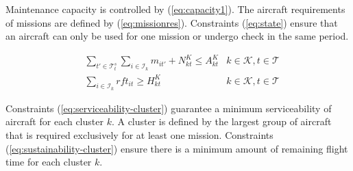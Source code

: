 \documentclass[a4paper,onecolumn,fleqn]{article}
\begin{document}
    Maintenance capacity is controlled by (\ref{eq:capacity1}). The aircraft requirements of missions are defined by (\ref{eq:missionres}). Constraints (\ref{eq:state}) ensure that an aircraft can only be used for one mission or undergo check in the same period.




    \begin{align}
       & \sum_{t' \in \mathcal{T}^s_t} \sum_{i \in \mathcal{I}_k} m_{it'} + N^K_{kt} \leq A^K_{kt}
        &k \in \mathcal{K}, t \in \mathcal{T} \label{eq:serviceability-cluster} \\
       & \sum_{i \in \mathcal{I}_k} rft_{it} \geq H^K_{kt}
        &k \in \mathcal{K}, t \in \mathcal{T} \label{eq:sustainability-cluster}
    \end{align}

    Constraints (\ref{eq:serviceability-cluster}) guarantee a minimum serviceability of aircraft for each cluster $k$. A cluster is defined by the largest group of aircraft that is required exclusively for at least one mission. Constraints (\ref{eq:sustainability-cluster}) ensure there is a minimum amount of remaining flight time for each cluster $k$.
\end{document}
